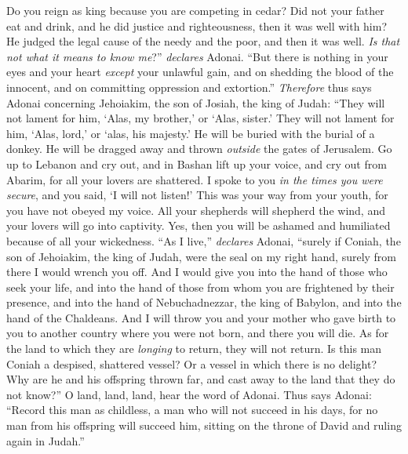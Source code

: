 \begin{biblechapter}
\verse Do you reign as king because you are competing in cedar? 
Did not your father eat and drink, 
and he did justice and righteousness, 
then it was well with him?
\verse He judged the legal cause of the needy and the poor, 
and then it was well. 
\textit{Is that not what it means to know me}?” \textit{declares} Adonai.
\verse “But there is nothing in your eyes and your heart 
\textit{except} your unlawful gain, 
and on shedding the blood of the innocent, 
and on committing oppression and extortion.”
\verse \textit{Therefore} thus says Adonai concerning Jehoiakim, the son of Josiah, the king of Judah:
\verse “They will not lament for him, 
‘Alas, my brother,’ or ‘Alas, sister.’ 
They will not lament for him, 
‘Alas, lord,’ or ‘alas, his majesty.’
\verse He will be buried with the burial of a donkey. 
He will be dragged away and thrown \textit{outside} the gates of Jerusalem.
\verse Go up to Lebanon and cry out, 
and in Bashan lift up your voice, 
and cry out from Abarim, 
for all your lovers are shattered.
\verse I spoke to you \textit{in the times you were secure}, 
and you said, ‘I will not listen!’ 
This was your way from your youth, 
for you have not obeyed my voice.
\verse All your shepherds will shepherd the wind, 
and your lovers will go into captivity. 
Yes, then you will be ashamed and humiliated 
because of all your wickedness.
\verse “As I live,” \textit{declares} Adonai, “surely if Coniah, the son of Jehoiakim, the king of Judah, were the seal on my right hand, surely from there I would wrench you off.
\verse And I would give you into the hand of those who seek your life, and into the hand of those from whom you are frightened by their presence, and into the hand of Nebuchadnezzar, the king of Babylon, and into the hand of the Chaldeans.
\verse And I will throw you and your mother who gave birth to you to another country where you were not born, and there you will die.
\verse As for the land to which they are \textit{longing} to return, they will not return.
\verse Is this man Coniah a despised, shattered vessel? 
Or a vessel in which there is no delight? 
Why are he and his offspring thrown far, 
and cast away to the land that they do not know?”
\verse O land, land, land, hear the word of Adonai.
\verse Thus says Adonai: “Record this man as childless, 
a man who will not succeed in his days, 
for no man from his offspring will succeed him, 
sitting on the throne of David and ruling again in Judah.”
\end{biblechapter}


